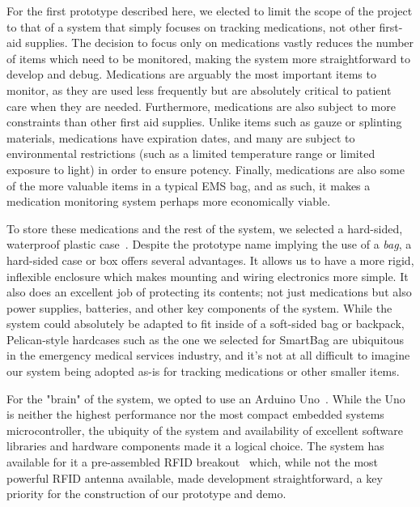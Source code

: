 \documentclass{sigchi}
\begin{document}
For the first prototype described here, we elected to limit the scope of the
project to that of a system that simply focuses on tracking medications, not
other first-aid supplies. The decision to focus only on medications vastly
reduces the number of items which need to be monitored, making the system more
straightforward to develop and debug. Medications are arguably the most important
items to monitor, as they are used less frequently but are absolutely critical
to patient care when they are needed. Furthermore, medications are also subject
to more constraints than other first aid supplies. Unlike items such as gauze or
splinting materials, medications have expiration dates, and many are subject to
environmental restrictions (such as a limited temperature range or limited
exposure to light) in order to ensure potency. Finally, medications are also
some of the more valuable items in a typical EMS bag, and as such, it makes
a medication monitoring system perhaps more economically viable.

To store these medications and the rest of the system, we selected a hard-sided,
waterproof plastic case~\cite{pelicase}. Despite the prototype name implying the
use of a \emph{bag}, a hard-sided case or box offers several advantages. It allows
us to have a more rigid, inflexible enclosure which makes mounting and wiring
electronics more simple. It also does an excellent job of protecting its contents;
not just medications but also power supplies, batteries, and other key components
of the system. While the system could absolutely be adapted to fit inside of a
soft-sided bag or backpack, Pelican-style hardcases such as the one we selected
for SmartBag are ubiquitous in the emergency medical services industry, and it's
not at all difficult to imagine our system being adopted as-is for tracking
medications or other smaller items.

For the "brain" of the system, we opted to use an Arduino Uno~\cite{arduino}.
While the Uno is neither the highest performance nor the most compact embedded
systems microcontroller, the ubiquity of the system and availability of excellent
software libraries and hardware components made it a logical choice. The system
has available for it a pre-assembled RFID breakout~\cite{rfid_breakout} which,
while not the most powerful RFID antenna available, made development
straightforward, a key priority for the construction of our prototype and demo.
\end{document}
